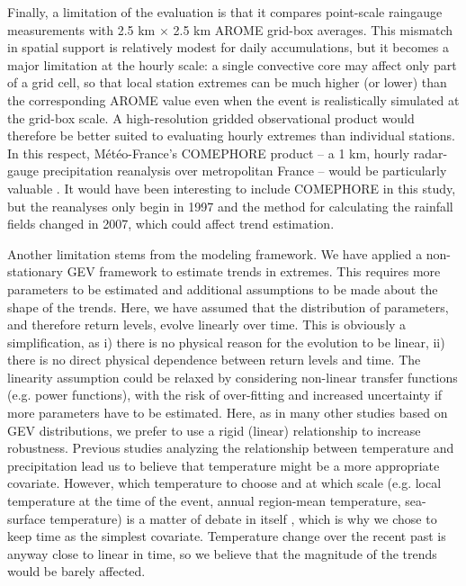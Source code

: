 \documentclass[hess, manuscript]{copernicus}
\begin{document}
Finally, a limitation of the evaluation is that it compares point-scale raingauge measurements with 2.5 km $\times$ 2.5 km AROME grid-box averages. This mismatch in spatial support is relatively modest for daily accumulations, but it becomes a major limitation at the hourly scale: a single convective core may affect only part of a grid cell, so that local station extremes can be much higher (or lower) than the corresponding AROME value even when the event is realistically simulated at the grid-box scale. A high-resolution gridded observational product would therefore be better suited to evaluating hourly extremes than individual stations. In this respect, Météo-France’s COMEPHORE product -- a 1 km, hourly radar-gauge precipitation reanalysis over metropolitan France -- would be particularly valuable \citep{MeteoFrance_COMEPHORE_dataGouv}. It would have been interesting to include COMEPHORE in this study, but the reanalyses only begin in 1997 and the method for calculating the rainfall fields changed in 2007, which could affect trend estimation.


Another limitation stems from the modeling framework. We have applied a non-stationary GEV framework to estimate trends in extremes. This requires more parameters to be estimated and additional assumptions to be made about the shape of the trends. Here, we have assumed that the distribution of parameters, and therefore return levels, evolve linearly over time. This is obviously a simplification, as i) there is no physical reason for the evolution to be linear, ii) there is no direct physical dependence between return levels and time. The linearity assumption could be relaxed by considering non-linear transfer functions (e.g. power functions), with the risk of over-fitting and increased uncertainty if more parameters have to be estimated. Here, as in many other studies based on GEV distributions, we prefer to use a rigid (linear) relationship to increase robustness. Previous studies analyzing the relationship between temperature and precipitation \citep{DaSilva2025} lead us to believe that temperature might be a more appropriate covariate.
However, which temperature to choose and at which scale (e.g. local temperature at the time of the event, annual region-mean temperature, sea-surface temperature)  is a matter of debate in itself \citep{Schroeer2018, Dash2023, Zeder2020}, which is why we chose to keep time as the simplest covariate. Temperature change over the recent past is anyway close to linear in time, so we believe that the magnitude of the trends would be barely affected.
\end{document}

